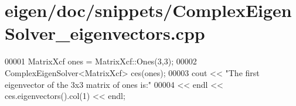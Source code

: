 \hypertarget{eigen_2doc_2snippets_2_complex_eigen_solver__eigenvectors_8cpp_source}{}\section{eigen/doc/snippets/\+Complex\+Eigen\+Solver\+\_\+eigenvectors.cpp}
\label{eigen_2doc_2snippets_2_complex_eigen_solver__eigenvectors_8cpp_source}

\begin{DoxyCode}
00001 MatrixXcf ones = MatrixXcf::Ones(3,3);
00002 ComplexEigenSolver<MatrixXcf> ces(ones);
00003 cout << \textcolor{stringliteral}{"The first eigenvector of the 3x3 matrix of ones is:"} 
00004      << endl << ces.eigenvectors().col(1) << endl;
\end{DoxyCode}
